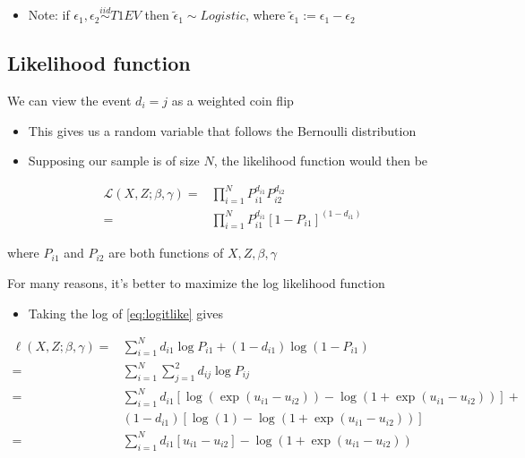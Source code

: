 \documentclass[11pt]{article}
\begin{document}
\begin{itemize}
\item Note: if \(\epsilon_1,\epsilon_2 \overset{iid}{\sim} T1EV\) then  \(\tilde{\epsilon}_1 \sim Logistic\), where \(\tilde{\epsilon}_1 := \epsilon_1-\epsilon_2\)
\end{itemize}

\subsection{Likelihood function}
\label{sec:org6f91823}

We can view the event \(d_i = j\) as a weighted coin flip

\begin{itemize}
\item This gives us a random variable that follows the Bernoulli distribution
\item Supposing our sample is of size \(N\), the likelihood function would then be
\end{itemize}
\begin{align}
\mathcal{L}\left(X,Z;\beta,\gamma\right)=&\prod_{i=1}^N P_{i1}^{d_{i1}} P_{i2}^{d_{i2}} \nonumber\\
=&\prod_{i=1}^N P_{i1}^{d_{i1}}\left[1-P_{i1}\right]^{(1-d_{i1})}\label{eq:logitlike}
\end{align}

where \(P_{i1}\) and \(P_{i2}\) are both functions of \(X,Z,\beta,\gamma\)

For many reasons, it's better to maximize the log likelihood function

\begin{itemize}
\item Taking the log of \eqref{eq:logitlike} gives
\end{itemize}

\begin{align}
\ell\left(X,Z;\beta,\gamma\right)=&\sum_{i=1}^N d_{i1}\log P_{i1} + (1-d_{i1}) \log \left(1-P_{i1}\right)\nonumber\\
=&\sum_{i=1}^N \sum_{j=1}^2 d_{ij}\log P_{ij}\label{eq:logitloglike}\\
=&\sum_{i=1}^N d_{i1}\left[\log \left(\exp (u_{i1}-u_{i2})\right)-\log\left(1 + \exp(u_{i1}-u_{i2})\right)\right] + \nonumber\\
&(1-d_{i1}) \left[\log \left(1\right)-\log \left(1 + \exp (u_{i1}-u_{i2})\right)\right]\nonumber\\
=&\sum_{i=1}^N d_{i1} \left[u_{i1}-u_{i2}\right]-\log\left(1+\exp(u_{i1}-u_{i2})\right)\nonumber
\end{align}
\end{document}

